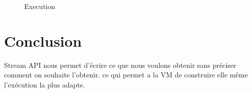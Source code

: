 \documentclass[a4paper, 11pt]{article}
\begin{document}
\begin{figure}[h!]
  \qquad
  
  \caption{Execution}%
  \label{fig:example}%
\end{figure}


\section*{Conclusion}
Stream API nous permet d’écrire ce que nous voulons obtenir sans préciser comment on souhaite l'obtenir. ce qui permet a la VM de construire elle même l’exécution la plus adapte.
\end{document}
